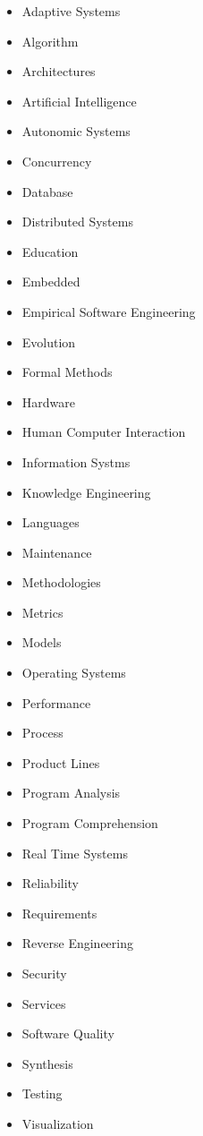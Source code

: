 \begin{multicols}{4}
  \begin{itemize}
  \item Adaptive Systems
  \item Algorithm
  \item Architectures
  \item Artificial Intelligence
  \item Autonomic Systems
  \item Concurrency
  \item Database
  \item Distributed Systems
  \item Education
  \item Embedded
  \item Empirical Software Engineering
  \item Evolution
  \item Formal Methods
  \item Hardware
  \item Human Computer Interaction
  \item Information Systms
  \item Knowledge Engineering
  \item Languages
  \item Maintenance
  \item Methodologies
  \item Metrics
  \item Models
  \item Operating Systems
  \item Performance
  \item Process
  \item Product Lines
  \item Program Analysis
  \item Program Comprehension
  \item Real Time Systems
  \item Reliability
  \item Requirements
  \item Reverse Engineering
  \item Security
  \item Services
  \item Software Quality
  \item Synthesis
  \item Testing
  \item Visualization
  \end{itemize}
  \label{int:tblTopicos}
\end{multicols}
